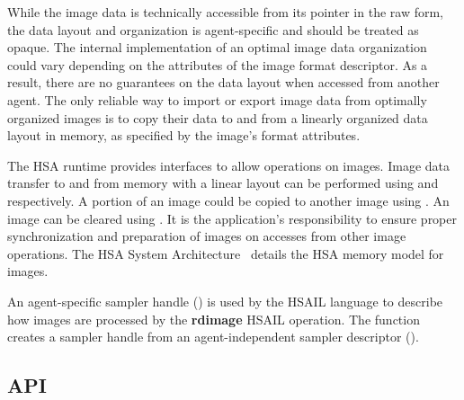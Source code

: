 \documentclass[final,oneside]{book}
\newcommand{\reffun}[1]{\textbf{#1}}
\newcommand{\refhsl}[1]{\reffun{#1}}
\begin{document}
While the image data is technically accessible from its pointer in the raw form,
the data layout and organization is agent-specific and should be treated as
opaque. The internal implementation of an optimal image data organization could
vary depending on the attributes of the image format descriptor. As a result,
there are no guarantees on the data layout when accessed from another agent. The
only reliable way to import or export image data from optimally organized images
is to copy their data to and from a linearly organized data layout in memory, as
specified by the image's format attributes.

The HSA runtime provides interfaces to allow operations on images. Image data
transfer to and from memory with a linear layout can be performed using
 and  respectively. A
portion of an image could be copied to another image using
. An image can be cleared using
. It is the application's responsibility to ensure
proper synchronization and preparation of images on accesses from other image
operations. The HSA System Architecture~\cite{sar} details the HSA memory
model for images.

An agent-specific sampler handle () is used by the
HSAIL language to describe how images are processed by the \refhsl{rdimage}
HSAIL operation. The function  creates a sampler
handle from an agent-independent sampler descriptor
().

\subsection{API}




\appendix
\end{document}

